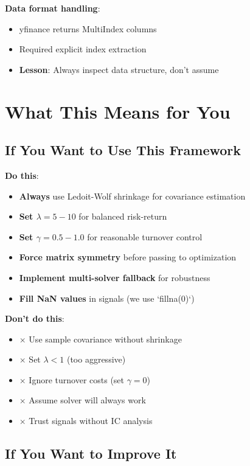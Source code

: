 \documentclass[a4paper,12pt]{article}
\begin{document}
\textbf{Data format handling}:
\begin{itemize}
    \item yfinance returns MultiIndex columns
    \item Required explicit index extraction
    \item \textbf{Lesson}: Always inspect data structure, don't assume
\end{itemize}

\section{What This Means for You}

\subsection{If You Want to Use This Framework}

\textbf{Do this}:
\begin{itemize}
    \item \textbf{Always} use Ledoit-Wolf shrinkage for covariance estimation
    \item \textbf{Set $\lambda = 5-10$} for balanced risk-return
    \item \textbf{Set $\gamma = 0.5-1.0$} for reasonable turnover control
    \item \textbf{Force matrix symmetry} before passing to optimization
    \item \textbf{Implement multi-solver fallback} for robustness
    \item \textbf{Fill NaN values} in signals (we use `fillna(0)`)
\end{itemize}

\textbf{Don't do this}:
\begin{itemize}
    \item $\times$ Use sample covariance without shrinkage
    \item $\times$ Set $\lambda < 1$ (too aggressive)
    \item $\times$ Ignore turnover costs (set $\gamma = 0$)
    \item $\times$ Assume solver will always work
    \item $\times$ Trust signals without IC analysis
\end{itemize}

\subsection{If You Want to Improve It}
\end{document}
